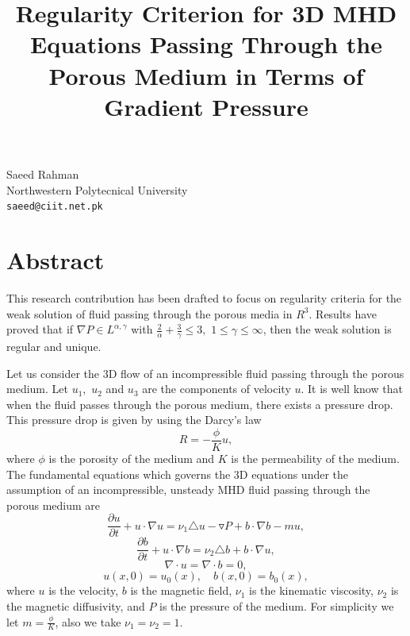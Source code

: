\documentclass[article,A4,11pt]{llncs}%
\begin{document}
\title{Regularity Criterion for 3D MHD Equations Passing Through the Porous Medium in Terms of Gradient Pressure}
 \author{} \institute{}
\maketitle
\begin{center}
{\large Saeed  Rahman}\\
Northwestern Polytecnical University\\
{\tt saeed@ciit.net.pk}
\end{center}

\section*{Abstract}
This research contribution has been drafted to focus on regularity criteria for the weak solution of fluid passing through the porous media in $R^{3}$.  Results have proved that if $ \nabla P\in L^{\alpha,\gamma}$ with $\frac {2}{\alpha}+\frac {3}{\gamma}\leq3,$ $1\leq\gamma\leq\infty$, then the weak solution is regular and unique.

Let us consider the 3D flow of an incompressible fluid passing through the porous medium. Let $u_{1},$ $u_{2}$ and $u_{3}$ are the components of velocity
$u.$ It is well know that when the fluid passes through the porous medium, there exists a pressure drop. This pressure drop is given by using the Darcy's law
\begin{equation*}
R=-\frac {\phi} {K} u,
\end{equation*}
where $\phi$ is the porosity of the medium and $K$ is the permeability of the medium. The fundamental equations which governs the 3D equations under the assumption of an incompressible, unsteady MHD fluid passing through the porous medium are
\begin{equation}
\frac{\partial u}{\partial t}+u\cdot\nabla u
=\nu_{1}\triangle u-\triangledown P+
b\cdot\nabla b-mu,
\end{equation}
\begin{equation}
\frac{\partial b}{\partial t}+u\cdot\nabla b
=\nu_{2}\triangle b + b\cdot\nabla u,
\end{equation}
\begin{equation}
\nabla\cdot u= \nabla\cdot b=0,
\end{equation}
\begin{equation}\label {6}
u(x,0)=u_{0}(x),
\quad b(x,0)=b_{0}(x),
\end{equation}
where $u$ is the velocity, $b$ is the magnetic field, $\nu_{1}$ is the kinematic viscosity, $\nu_{2}$ is the magnetic diffusivity, and $P$ is the pressure of the medium. For simplicity we let $m=\frac {\phi}{K}$, also we take $\nu_{1}=\nu_{2}=1.$
\end{document}
